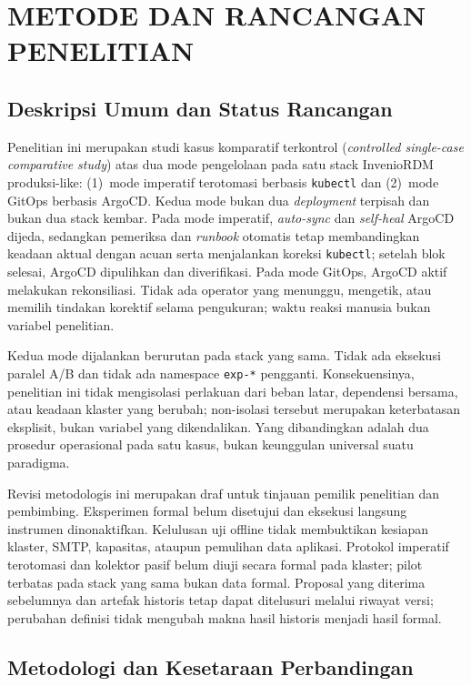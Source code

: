 \chapter{METODE DAN RANCANGAN PENELITIAN}

\section{Deskripsi Umum dan Status Rancangan}

Penelitian ini merupakan studi kasus komparatif terkontrol (\textit{controlled single-case comparative study}) atas dua mode pengelolaan pada satu stack InvenioRDM produksi-like: (1)~mode imperatif terotomasi berbasis \texttt{kubectl} dan (2)~mode GitOps berbasis ArgoCD. Kedua mode bukan dua \textit{deployment} terpisah dan bukan dua stack kembar. Pada mode imperatif, \textit{auto-sync} dan \textit{self-heal} ArgoCD dijeda, sedangkan pemeriksa dan \textit{runbook} otomatis tetap membandingkan keadaan aktual dengan acuan serta menjalankan koreksi \texttt{kubectl}; setelah blok selesai, ArgoCD dipulihkan dan diverifikasi. Pada mode GitOps, ArgoCD aktif melakukan rekonsiliasi. Tidak ada operator yang menunggu, mengetik, atau memilih tindakan korektif selama pengukuran; waktu reaksi manusia bukan variabel penelitian.

Kedua mode dijalankan berurutan pada stack yang sama. Tidak ada eksekusi paralel A/B dan tidak ada namespace \texttt{exp-*} pengganti. Konsekuensinya, penelitian ini tidak mengisolasi perlakuan dari beban latar, dependensi bersama, atau keadaan klaster yang berubah; non-isolasi tersebut merupakan keterbatasan eksplisit, bukan variabel yang dikendalikan. Yang dibandingkan adalah dua prosedur operasional pada satu kasus, bukan keunggulan universal suatu paradigma.

Revisi metodologis ini merupakan draf untuk tinjauan pemilik penelitian dan pembimbing. Eksperimen formal belum disetujui dan eksekusi langsung instrumen dinonaktifkan. Kelulusan uji offline tidak membuktikan kesiapan klaster, SMTP, kapasitas, ataupun pemulihan data aplikasi. Protokol imperatif terotomasi dan kolektor pasif belum diuji secara formal pada klaster; pilot terbatas pada stack yang sama bukan data formal. Proposal yang diterima sebelumnya dan artefak historis tetap dapat ditelusuri melalui riwayat versi; perubahan definisi tidak mengubah makna hasil historis menjadi hasil formal.

\section{Metodologi dan Kesetaraan Perbandingan}

